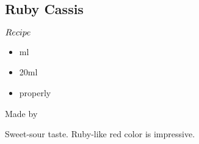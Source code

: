 \subsection{Ruby Cassis}
\begin{itembox}[l]{\boldmath $Recipe$}
\begin{itemize}
\setlength{\parskip}{0cm}
\setlength{\itemsep}{0cm}
\item {} ml
\item \vermouth 20ml
\item \tw properly
\end{itemize}
\vspace{-4mm}
Made by \build
\end{itembox}
Sweet-sour taste.  Ruby-like red color is impressive.
